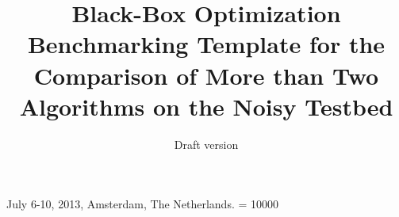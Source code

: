 \documentclass{sig-alternate}
\begin{document}
%
 {July 6-10, 2013, Amsterdam, The Netherlands.}
\widowpenalty = 10000

\title{Black-Box Optimization Benchmarking Template for the Comparison of More than Two Algorithms on the Noisy Testbed}
\subtitle{Draft version
}

%
%
%
%
%
\end{document}
